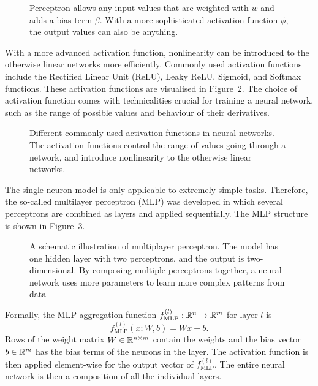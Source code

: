 \begin{figure}[H]
    \centering
    
    \caption{\label{fig:perceptron}Perceptron allows any input values that are weighted with $w$ and adds a bias term $\beta$.
    With a more sophisticated activation function $\phi$, the output values can also be anything.}
\end{figure}

With a more advanced activation function, nonlinearity can be introduced to the otherwise linear networks more efficiently.
Commonly used activation functions include the Rectified Linear Unit (ReLU), Leaky ReLU, Sigmoid, and Softmax functions.
These activation functions are visualised in Figure~\ref{fig:activations}.
The choice of activation function comes with technicalities crucial for training a neural network, such as the range of possible values and behaviour of their derivatives.

\begin{figure}[H]
    \caption{\label{fig:activations}Different commonly used activation functions in neural networks.
    The activation functions control the range of values going through a network, and introduce nonlinearity to the otherwise linear networks.}
\end{figure}

The single-neuron model is only applicable to extremely simple tasks.
Therefore, the so-called multilayer perceptron (MLP) was developed in which several perceptrons are combined as layers and applied sequentially.
The MLP structure is shown in Figure~\ref{fig:mlp}.
\begin{figure}[H]
    \centering
    
    \caption{\label{fig:mlp} A schematic illustration of multiplayer perceptron.
        The model has one hidden layer with two perceptrons, and the output is two-dimensional.
        By composing multiple perceptrons together, a neural network uses more parameters to learn more complex patterns from data}
\end{figure}
Formally, the MLP aggregation function $f^{(l)}_{\text{MLP}} : \mathbb{R}^n \rightarrow \mathbb{R}^m$ for layer $l$ is
\begin{equation*}
    f^{(l)}_{\text{MLP}}(x; W, b) = W x + b.
\end{equation*}
Rows of the weight matrix $W \in \mathbb{R}^{n \times m}$ contain the weights and the bias vector $b \in \mathbb{R}^{m}$ has the bias terms of the neurons in the layer.
The activation function is then applied element-wise for the output vector of $f^{(l)}_{\text{MLP}}$.
The entire neural network is then a composition of all the individual layers.

